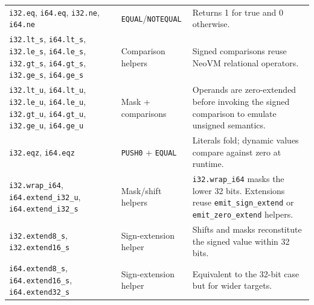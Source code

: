 \documentclass[11pt]{article}
\begin{document}
\begin{longtable}{@{}p{4.7cm}p{3.8cm}p{6.5cm}@{}}
\tabularnewline
\texttt{i32.eq}, \texttt{i64.eq}, \texttt{i32.ne}, \texttt{i64.ne} & \texttt{EQUAL}/\texttt{NOTEQUAL} & Returns 1 for true and 0 otherwise.
\tabularnewline
\texttt{i32.lt\_s}, \texttt{i64.lt\_s}, \texttt{i32.le\_s}, \texttt{i64.le\_s}, \texttt{i32.gt\_s}, \texttt{i64.gt\_s}, \texttt{i32.ge\_s}, \texttt{i64.ge\_s} & Comparison helpers & Signed comparisons reuse NeoVM relational operators.
\tabularnewline
\texttt{i32.lt\_u}, \texttt{i64.lt\_u}, \texttt{i32.le\_u}, \texttt{i64.le\_u}, \texttt{i32.gt\_u}, \texttt{i64.gt\_u}, \texttt{i32.ge\_u}, \texttt{i64.ge\_u} & Mask + comparisons & Operands are zero-extended before invoking the signed comparison to emulate unsigned semantics.
\tabularnewline
\texttt{i32.eqz}, \texttt{i64.eqz} & \texttt{PUSH0} + \texttt{EQUAL} & Literals fold; dynamic values compare against zero at runtime.
\tabularnewline
\texttt{i32.wrap\_i64}, \texttt{i64.extend\_i32\_u}, \texttt{i64.extend\_i32\_s} & Mask/shift helpers & \texttt{i32.wrap\_i64} masks the lower 32 bits. Extensions reuse \texttt{emit\_sign\_extend} or \texttt{emit\_zero\_extend} helpers.
\tabularnewline
\texttt{i32.extend8\_s}, \texttt{i32.extend16\_s} & Sign-extension helper & Shifts and masks reconstitute the signed value within 32 bits.
\tabularnewline
\texttt{i64.extend8\_s}, \texttt{i64.extend16\_s}, \texttt{i64.extend32\_s} & Sign-extension helper & Equivalent to the 32-bit case but for wider targets.
\tabularnewline
\end{longtable}
\end{document}
